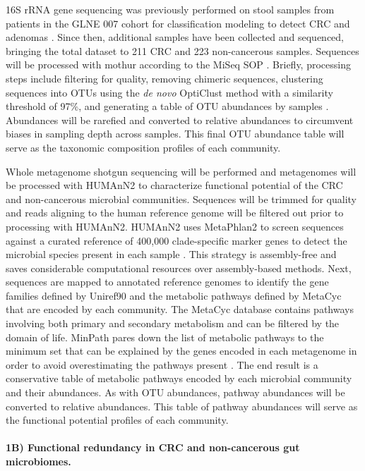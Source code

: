 \documentclass[11pt]{article}
\begin{document}
16S rRNA gene sequencing was previously performed on stool samples from patients in the GLNE 007 cohort for classification modeling to detect CRC and adenomas \cite{baxter_microbiota-based_2016}.
Since then, additional samples have been collected and sequenced, bringing the total dataset to 211 CRC and 223 non-cancerous samples.
Sequences will be processed with mothur according to the MiSeq SOP \cite{schloss_introducing_2009, kozich_development_2013}.
Briefly, processing steps include filtering for quality, removing chimeric sequences, clustering sequences into OTUs using the \textit{de novo} OptiClust method with a similarity threshold of 97\%,
and generating a table of OTU abundances by samples \cite{westcott_opticlust_2017}.
Abundances will be rarefied and converted to relative abundances to circumvent biases in sampling depth across samples.
This final OTU abundance table will serve as the taxonomic composition profiles of each community.

Whole metagenome shotgun sequencing will be performed and metagenomes will be processed with HUMAnN2 \cite{franzosa_species-level_2018} to characterize functional potential of the CRC and non-cancerous microbial communities.
Sequences will be trimmed for quality and reads aligning to the human reference genome will be filtered out prior to processing with HUMAnN2.
HUMAnN2 uses MetaPhlan2 to screen sequences against a curated reference of 400,000 clade-specific marker genes to detect the microbial species present in each sample \cite{segata_metagenomic_2012}.
This strategy is assembly-free and saves considerable computational resources over assembly-based methods.
Next, sequences are mapped to annotated reference genomes to identify the gene families defined by Uniref90 and the metabolic pathways defined by MetaCyc \cite{caspi_metacyc_2018} that are encoded by each community.
The MetaCyc database contains pathways involving both primary and secondary metabolism and can be filtered by the domain of life.
MinPath pares down the list of metabolic pathways to the minimum set that can be explained by the genes encoded in each metagenome in order to avoid overestimating the pathways present \cite{ye_parsimony_2009}.
The end result is a conservative table of metabolic pathways encoded by each microbial community and their abundances.
As with OTU abundances, pathway abundances will be converted to relative abundances.
This table of pathway abundances will serve as the functional potential profiles of each community.


\paragraph{1B) Functional redundancy in CRC and non-cancerous gut microbiomes.}
\end{document}
